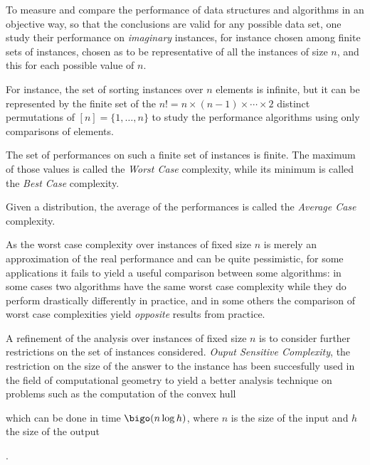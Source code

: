 To measure and compare the performance of data structures and
algorithms in an objective way, so that the conclusions are valid for
any possible data set, one study their performance on \emph{imaginary}
instances, for instance chosen among finite sets of instances, chosen
as to be representative of all the instances of size $n$, and this for
each possible value of $n$.
%
\begin{EXAMPLE}
  For instance, the set of sorting instances over $n$ elements is
  infinite, but it can be represented by the finite set of the
  $n!=n\times(n-1)\times\cdots\times2$ distinct permutations of
  $[n]=\{1,\ldots,n\}$ to study the performance algorithms using only
  comparisons of elements.
\end{EXAMPLE}
\begin{LONG}
  
\end{LONG}
The set of performances on such a finite set of instances is finite.
%
The maximum of those values is called the \emph{Worst Case}
complexity, while its minimum is called the \emph{Best Case}
complexity.
%
\begin{LONG}
  Given a distribution, the average of the performances is called the
  \emph{Average Case} complexity.
\end{LONG}
%
\begin{LONG}
  As the worst case complexity over instances of fixed size $n$ is
  merely an approximation of the real performance and can be quite
  pessimistic, for some applications it fails to yield a useful
  comparison between some algorithms: in some cases two algorithms
  have the same worst case complexity while they do perform
  drastically differently in practice, and in some others the
  comparison of worst case complexities yield \emph{opposite} results
  from practice.
\end{LONG}
%
\begin{LONG}
  
\end{LONG}
%
A refinement of the analysis over instances of fixed size $n$ is to
consider further restrictions on the set of instances considered.
%
%
\emph{Ouput Sensitive Complexity}, the restriction on the size of the
answer to the instance has been succesfully used in the field of
computational geometry to yield a better analysis technique on
problems such as the computation of the convex
hull~\cite{outputSensitiveResultsOnConvexHullsExtremePointsAndRelatedProblems}\begin{EXAMPLE}
  which can be done in time $\bigo(n\log h)$, where $n$ is the size of
  the input and $h$ the size of the output
\end{EXAMPLE}.
